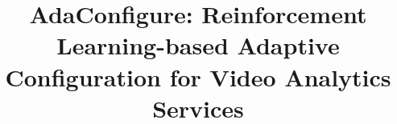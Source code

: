 \documentclass{article}
\begin{document}
\sloppy

\def\x{{\mathbf x}}
\def\L{{\cal L}}

\title{AdaConfigure: Reinforcement Learning-based Adaptive Configuration for Video Analytics Services}

%
\address{\textsuperscript{\rm 1}Department of Computer Science and Technology, Tsinghua University, China\\ 
\textsuperscript{\rm 2}Tsinghua Shenzhen International Graduate School, Tsinghua University, China\\
\textsuperscript{\rm 3}Tsinghua-Berkeley Shenzhen Institute, Tsinghua University, China
}

\maketitle





%






\end{document}
